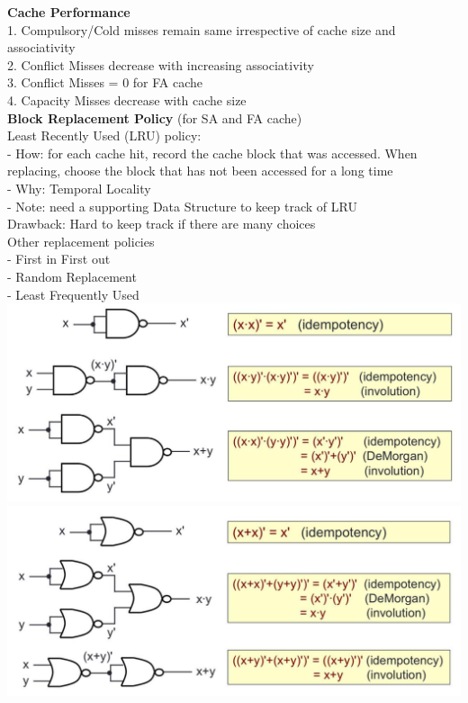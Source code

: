 \documentclass[10pt, a4paper]{article}
\newcommand{\blue}[1]{{\color{MidnightBlue}#1}}
\newcommand{\red}[1]{{\color{red}#1}}
\begin{document}
\begin{multicols*}{3}
		\textbf{Cache Performance}\\
		1. Compulsory/Cold misses remain same irrespective of cache size and associativity\\
		2. Conflict Misses decrease with increasing associativity\\
		3. Conflict Misses = 0 for FA cache\\
		4. Capacity Misses decrease with cache size\\

		\textbf{Block Replacement Policy} (for SA and FA cache)\\
		Least Recently Used (LRU) policy:\\
		- \blue{How}: for each cache hit, record the cache block that was accessed. When replacing, choose the block that has not been accessed for a long time\\
		- \blue{Why}: Temporal Locality\\
		- Note: need a supporting Data Structure to keep track of LRU\\
		\red{Drawback}: Hard to keep track if there are many choices\\

		Other replacement policies\\
		- First in First out\\
		- Random Replacement\\
		- Least Frequently Used\\

		\includegraphics[scale=.28]{./assets/nandGate}\\
		\includegraphics[scale=.28]{./assets/norGate}\\

	\end{multicols*}
\end{document}
